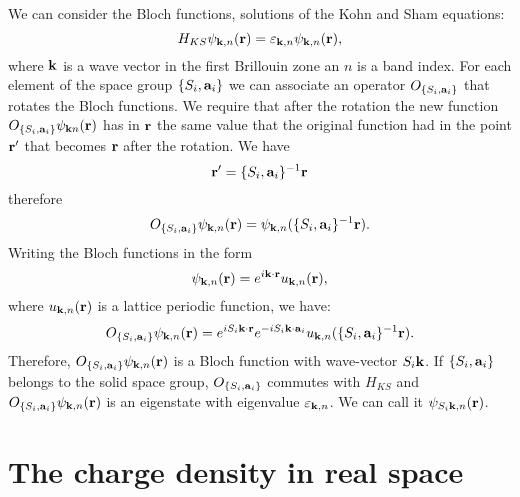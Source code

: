 \documentclass[12pt,a4paper,twoside]{report}
\begin{document}
We can consider the Bloch functions, solutions of the Kohn and Sham equations:
\begin{equation}
H_{KS} \psi_{{\bf k}, n}({\bf r})= \varepsilon_{{\bf k}, n}\psi_{{\bf k}, n} ({\bf r}),
\end{equation}
where ${\bf k}$ is a wave vector in the first Brillouin zone an $n$ is a band index.
For each element of the space group $\{S_i,{\bf a}_i\}$ we can associate an operator $O_{\{S_i,{\bf a}_i\}}$ that rotates the Bloch functions. We require that after the rotation the new function $O_{\{S_i,{\bf a}_i\}} \psi_{{\bf k} n} ({\bf r})$ has in ${\bf r}$ the same value that the original function had in the point
${\bf r}'$ that becomes ${\bf r}$ after the rotation.
We have 
\begin{equation}
{\bf r}'= \{S_i,{\bf a}_i\}^{-1} {\bf r}
\end{equation}
therefore
\begin{equation}
O_{\{S_i,{\bf a}_i\}} \psi_{{\bf k}, n} ({\bf r}) =
\psi_{{\bf k}, n} (\{S_i,{\bf a}_i\}^{-1} {\bf r}).
\end{equation}
Writing the Bloch functions in the form
\begin{equation}
\psi_{{\bf k}, n} ({\bf r}) = e^{i{\bf k} \cdot {\bf r}} u_{{\bf k}, n} ({\bf r}),
\end{equation}
where $u_{{\bf k}, n} ({\bf r})$ is a lattice periodic function, we have:
\begin{equation}
O_{\{S_i,{\bf a}_i\}} \psi_{{\bf k}, n} ({\bf r})
= e^{iS_i{\bf k} \cdot {\bf r}}e^{-iS_i{\bf k} \cdot {\bf a}_i} u_{{\bf k}, n} (\{S_i,{\bf a}_i\}^{-1} {\bf r}).
\label{psisik}
\end{equation}
Therefore, $O_{\{S_i,{\bf a}_i\}} \psi_{{\bf k}, n} ({\bf r})$ is a Bloch function with wave-vector $S_i {\bf k}$.
If $\{S_i,{\bf a}_i\}$ belongs to the solid space group, $O_{\{S_i,{\bf a}_i\}}$ commutes with $H_{KS}$
and $O_{\{S_i,{\bf a}_i\}} \psi_{{\bf k}, n} ({\bf r})$
is an eigenstate with
eigenvalue $\varepsilon_{{\bf k}, n}$. We can call it $\psi_{S_i {\bf k},n} ({\bf r})$.

\section{The charge density in real space}
\end{document}
